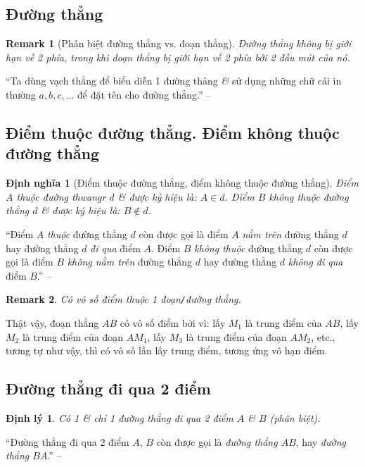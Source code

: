 \documentclass[oneside]{book}
\numberwithin{equation}{section}
\newtheorem{dinhnghia}{Định nghĩa}[section]
\newtheorem{remark}{Remark}[section]
\newtheorem{dinhly}{Định lý}[section]
\begin{document}
\subsection{Đường thẳng}

\begin{remark}[Phân biệt đường thẳng vs. đoạn thẳng]
	Đường thẳng không bị giới hạn về 2 phía, trong khi đoạn thẳng bị giới hạn về 2 phía bởi 2 đầu mút của nó.
\end{remark}
``Ta dùng vạch thẳng để biểu diễn 1 đường thảng \textit{\&} sử dụng những chữ cái in thường $a,b,c,\ldots$ để đặt tên cho đường thẳng.'' -- \cite[p. 76]{Thai_Anh_Dat_Ha_Loan_Nam_Quang_Toan_6_tap_2}

\subsection{Điểm thuộc đường thẳng. Điểm không thuộc đường thẳng}

\begin{dinhnghia}[Điểm thuộc đường thẳng, điểm không thuộc đường thẳng]
	Điểm $A$ \emph{thuộc} đường thwangr $d$ \textit{\&} được ký hiệu là: $A\in d$. Điểm $B$ \emph{không thuộc} đường thẳng $d$ \textit{\&} được ký hiệu là: $B\notin d$.
\end{dinhnghia}
``Điểm $A$ \textit{thuộc} đường thẳng $d$ còn được gọi là điểm $A$ \textit{nằm trên} đường  thẳng $d$ hay đường thẳng $d$ \textit{đi qua} điểm $A$. Điểm $B$ \textit{không thuộc} đường thẳng $d$ còn được gọi là điểm $B$ \textit{không nằm trên} đường thẳng $d$ hay đường thẳng $d$ \textit{không đi qua} điểm $B$.'' -- \cite[p. 76]{Thai_Anh_Dat_Ha_Loan_Nam_Quang_Toan_6_tap_2}

\begin{remark}
	Có vô số điểm thuộc 1 đoạn\texttt{/}đường thẳng.
\end{remark}
Thật vậy, đoạn thẳng $AB$ có vô số điểm bởi vì: lấy $M_1$ là trung điểm của $AB$, lấy $M_2$ là trung điểm của đoạn $AM_1$, lấy $M_3$ là trung điểm của đoạn $AM_2$, etc., tương tự như vậy, thì có vô số lần lấy trung điểm, tương ứng vô hạn điểm.

\subsection{Đường thẳng đi qua 2 điểm}

\begin{dinhly}
	Có 1 \textit{\&} chỉ 1 đường thẳng đi qua 2 điểm $A$ \textit{\&} $B$ (phân biệt).
\end{dinhly}
``Đường thẳng đi qua 2 điểm $A$, $B$ còn được gọi là \textit{đường thẳng $AB$}, hay \textit{đường thẳng $BA$}.'' -- \cite[p. 77]{Thai_Anh_Dat_Ha_Loan_Nam_Quang_Toan_6_tap_2}
\end{document}
